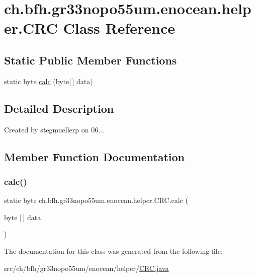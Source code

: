 \hypertarget{classch_1_1bfh_1_1gr33nopo55um_1_1enocean_1_1helper_1_1_c_r_c}{}\section{ch.\+bfh.\+gr33nopo55um.\+enocean.\+helper.\+C\+RC Class Reference}
\label{classch_1_1bfh_1_1gr33nopo55um_1_1enocean_1_1helper_1_1_c_r_c}
\subsection*{Static Public Member Functions}
\begin{DoxyCompactItemize}
\item 
static byte \hyperlink{classch_1_1bfh_1_1gr33nopo55um_1_1enocean_1_1helper_1_1_c_r_c_abb48b370c07120fd6c11af69925d7a9b}{calc} (byte\mbox{[}$\,$\mbox{]} data)
\end{DoxyCompactItemize}


\subsection{Detailed Description}
Created by stegmuellerp on 06... 

\subsection{Member Function Documentation}
\hypertarget{classch_1_1bfh_1_1gr33nopo55um_1_1enocean_1_1helper_1_1_c_r_c_abb48b370c07120fd6c11af69925d7a9b}{}\label{classch_1_1bfh_1_1gr33nopo55um_1_1enocean_1_1helper_1_1_c_r_c_abb48b370c07120fd6c11af69925d7a9b} 
\subsubsection{\texorpdfstring{calc()}{calc()}}
{\footnotesize\ttfamily static byte ch.\+bfh.\+gr33nopo55um.\+enocean.\+helper.\+C\+R\+C.\+calc (\begin{DoxyParamCaption}\item[{byte \mbox{[}$\,$\mbox{]}}]{data }\end{DoxyParamCaption})\hspace{0.3cm}{\ttfamily [static]}}



The documentation for this class was generated from the following file\+:\begin{DoxyCompactItemize}
\item 
src/ch/bfh/gr33nopo55um/enocean/helper/\hyperlink{_c_r_c_8java}{C\+R\+C.\+java}\end{DoxyCompactItemize}
